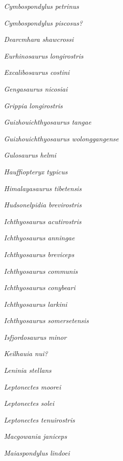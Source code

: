 \emph{Cymbospondylus petrinus}~

\emph{Cymbospondylus piscosus?}~

\emph{Dearcmhara shawcrossi}~

\emph{Eurhinosaurus longirostris}~

\emph{Excalibosaurus costini}~

\emph{Gengasaurus nicosiai}~

\emph{Grippia longirostris}~

\emph{Guizhouichthyosaurus tangae}~

\emph{Guizhouichthyosaurus wolonggangense}~

\emph{Gulosaurus helmi}~

\emph{Hauffiopteryx typicus}~

\emph{Himalayasaurus tibetensis}~

\emph{Hudsonelpidia brevirostris}~

\emph{Ichthyosaurus acutirostris}~

\emph{Ichthyosaurus anningae}~

\emph{Ichthyosaurus breviceps}~

\emph{Ichthyosaurus communis}~

\emph{Ichthyosaurus conybeari}~

\emph{Ichthyosaurus larkini}~

\emph{Ichthyosaurus somersetensis}~

\emph{Isfjordosaurus minor}~

\emph{Keilhauia nui?}~

\emph{Leninia stellans}~

\emph{Leptonectes moorei}~

\emph{Leptonectes solei}~

\emph{Leptonectes tenuirostris}~

\emph{Macgowania janiceps}~

\emph{Maiaspondylus lindoei}~

